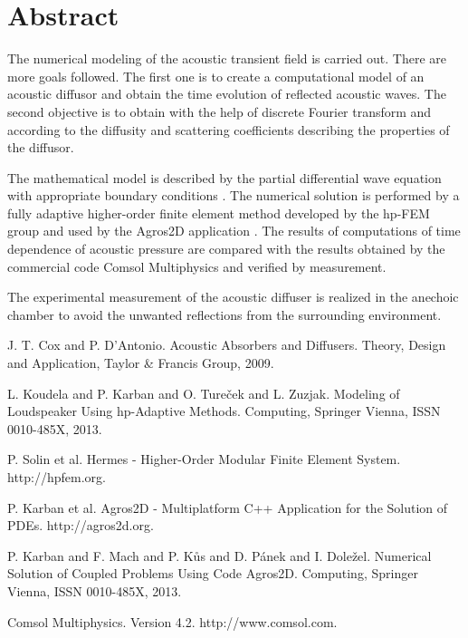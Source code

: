 \documentclass[article, A4, 11pt]{llncs}%
\begin{document}
\section*{Abstract}
The numerical modeling of the acoustic transient field is carried out. There are more goals followed. The first one is to create a computational model of an acoustic diffusor and obtain the time evolution of reflected acoustic waves. The second objective is to obtain with the help of discrete Fourier transform and according to \cite{Acoustic Absorbers and Diffusers} the diffusity and scattering coefficients describing the properties of the diffusor. 

The mathematical model is described by the partial differential wave equation with appropriate boundary conditions \cite{Modeling of Loudspeaker Using hp-Adaptive Methods}. The numerical solution is performed by a fully adaptive higher-order finite element method developed by the hp-FEM group \cite{Hermes - Higher-Order Modular Finite Element System} and used by the Agros2D application \cite{Agros2D - Multiplatform C++ Application for the Solution of PDEs} \cite{Numerical Solution of Coupled Problems Using Code Agros2D}. The results of computations of time dependence of acoustic pressure are compared with the results obtained by the commercial code Comsol Multiphysics \cite{Version 4.2} and verified by measurement. 

The experimental measurement of the acoustic diffuser is realized in the anechoic chamber to avoid the unwanted reflections from the surrounding environment.


\begin{thebibliography}{10}
{\sc  J. T. Cox and P. D’Antonio}. {Acoustic Absorbers and Diffusers}. Theory, Design and Application, Taylor \& Francis Group, 2009.

{\sc L. Koudela and P. Karban and O. Tureček and L. Zuzjak}. {Modeling of Loudspeaker Using hp-Adaptive Methods}. Computing, Springer Vienna, ISSN 0010-485X, 2013.

{\sc P. Solin et al}. {Hermes - Higher-Order Modular Finite Element System}. http://hpfem.org.

{\sc P. Karban et al}. {Agros2D - Multiplatform C++ Application for the Solution of PDEs}. http://agros2d.org.

{\sc P. Karban and F. Mach and P. Kůs and D. Pánek and I. Doležel}. {Numerical Solution of Coupled Problems Using Code Agros2D}. Computing, Springer Vienna, ISSN 0010-485X, 2013.

{\sc Comsol Multiphysics}. {Version 4.2}. http://www.comsol.com.
\end{thebibliography} %
\end{document}
